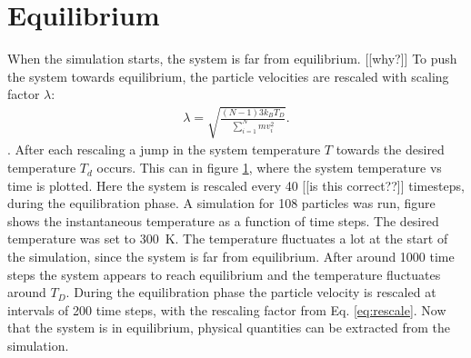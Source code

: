 \section{Equilibrium}
When the simulation starts, the system is far from equilibrium. [[why?]] To push the system towards equilibrium, the particle velocities are rescaled with scaling factor $\lambda$:
\begin{gather}\label{eq:rescale}
    \lambda=\sqrt{\frac{(N-1)3k_BT_D}{\sum_{i=1}^{N} mv_i^{2}}}.
\end{gather}. After each rescaling a jump in the system temperature $T$ towards the desired temperature $T_d$ occurs. This can in figure \ref{}, where the system temperature vs time is plotted. Here the system is rescaled every 40 [[is this correct??]] timesteps, during the equilibration phase.
A simulation for 108 particles was run, figure %
shows the instantaneous temperature as a function of time steps. The desired temperature was set to 300~K. The temperature fluctuates a lot at the start of the simulation, since the system is far from equilibrium. After around 1000 time steps the system appears to reach equilibrium and the temperature fluctuates around $T_D$. During the equilibration phase the particle velocity is rescaled at intervals of 200 time steps, with the rescaling factor from Eq. \ref{eq:rescale}. Now that the system is in equilibrium, physical quantities can be extracted from the simulation.
